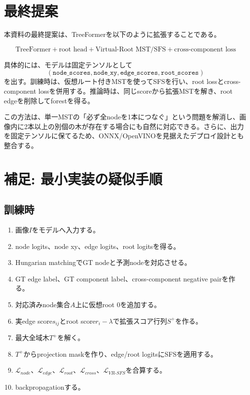 \documentclass[11pt,a4paper]{article}
\begin{document}
\section{最終提案}
本資料の最終提案は、TreeFormerを以下のように拡張することである。

\begin{equation}
\boxed{
\text{TreeFormer} + \text{root head} + \text{Virtual-Root MST/SFS} + \text{cross-component loss}
}
\end{equation}

具体的には、モデルは固定テンソルとして
\begin{equation}
  (\texttt{node\_scores},\texttt{node\_xy},\texttt{edge\_scores},\texttt{root\_scores})
\end{equation}
を出す。訓練時は、仮想ルート付きMSTを使ってSFSを行い、root lossとcross-component lossを併用する。推論時は、同じscoreから拡張MSTを解き、root edgeを削除してforestを得る。

この方法は、単一MSTの「必ず全nodeを1本につなぐ」という問題を解消し、画像内に2本以上の別個の木が存在する場合にも自然に対応できる。さらに、出力を固定テンソルに保てるため、ONNX/OpenVINOを見据えたデプロイ設計とも整合する。

\section{補足: 最小実装の疑似手順}
\subsection{訓練時}
\begin{enumerate}
  \item 画像$I$をモデルへ入力する。
  \item node logits、node xy、edge logits、root logitsを得る。
  \item Hungarian matchingでGT nodeと予測nodeを対応させる。
  \item GT edge label、GT component label、cross-component negative pairを作る。
  \item 対応済みnode集合$A$上に仮想root $0$を追加する。
  \item 実edge score$s_{ij}$とroot score$r_i-\lambda$で拡張スコア行列$S^+$を作る。
  \item 最大全域木$T^+$を解く。
  \item $T^+$からprojection maskを作り、edge/root logitsにSFSを適用する。
  \item $\mathcal{L}_{node}$、$\mathcal{L}_{edge}$、$\mathcal{L}_{root}$、$\mathcal{L}_{cross}$、$\mathcal{L}_{VR\text{-}SFS}$を合算する。
  \item backpropagationする。
\end{enumerate}
\end{document}
